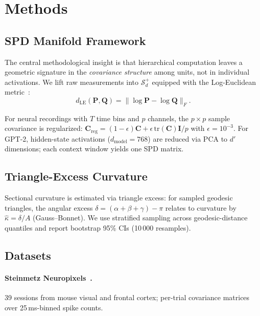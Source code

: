\documentclass[letterpaper]{article}
\begin{document}
\section{Methods}\label{sec:methods}

\subsection{SPD Manifold Framework}

The central methodological insight is that hierarchical
computation leaves a geometric signature in the
\emph{covariance structure} among units, not in
individual activations.
We lift raw measurements into $\mathcal{S}^+_d$
equipped with the Log-Euclidean
metric~\citep{arsigny2007}:
\begin{equation}\label{eq:logeuc}
  d_\mathrm{LE}(\mathbf{P},\mathbf{Q})
  = \|\log\mathbf{P} - \log\mathbf{Q}\|_F.
\end{equation}

For neural recordings with $T$ time bins and $p$
channels, the $p\times p$ sample covariance is
regularized:
$\mathbf{C}_\mathrm{reg}=(1{-}\epsilon)\mathbf{C}
+\epsilon\,\mathrm{tr}(\mathbf{C})\mathbf{I}/p$
with $\epsilon=10^{-3}$.
For GPT-2, hidden-state activations
($d_\mathrm{model}=768$) are reduced via PCA to $d'$
dimensions; each context window yields one SPD matrix.

\subsection{Triangle-Excess Curvature}

Sectional curvature is estimated via triangle excess:
for sampled geodesic triangles, the angular excess
$\delta=(\alpha+\beta+\gamma)-\pi$ relates to
curvature by $\hat{\kappa}=\delta/A$ (Gauss--Bonnet).
We use stratified sampling across geodesic-distance
quantiles and report bootstrap 95\% CIs (10\,000
resamples).

\subsection{Datasets}

\paragraph{Steinmetz Neuropixels~\citep{steinmetz2019}.}
39 sessions from mouse visual and frontal cortex;
per-trial covariance matrices over 25\,ms-binned spike
counts.
\end{document}
